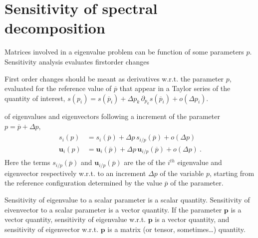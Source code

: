 \documentclass[letterpaper,10pt,english]{jupyterBook}
\begin{document}
\section{Sensitivity of spectral decomposition}
\label{\detokenize{ch/linear-algebra/spectral-sensitivity:sensitivity-of-spectral-decomposition}}\label{\detokenize{ch/linear-algebra/spectral-sensitivity:math-spectral-sensitivity}}\label{\detokenize{ch/linear-algebra/spectral-sensitivity::doc}}
\sphinxAtStartPar
Matrices involved in a eigenvalue problem can be function of some parameters \(p\). Sensitivity analysis evaluates first\sphinxhyphen{}order changes%
\begin{footnote}[1]\sphinxAtStartFootnote
First order changes should be meant as derivatives w.r.t. the parameter \(p\), evaluated for the reference value of \(\overline{p}\) that appear in a Taylor series of the quantity of interest, \(s(p_i) = s(\overline{p}_i) + \Delta p_k \, \partial_{p_k} s(\overline{p}_i) + o(\Delta p_i)\).
%
\end{footnote} of eigenvalues and eigenvectors following a increment of the parameter \(p = \overline{p} + \Delta p\),
\begin{equation*}
\begin{split}\begin{aligned}
  s_i(p) & = s_i(\overline{p}) + \Delta p \, s_{i/p} (\overline{p}) + o(\Delta p) \\
  \mathbf{u}_i(p) & = \mathbf{u}_i(\overline{p}) + \Delta p \, \mathbf{u}_{i/p} (\overline{p}) + o(\Delta p) \ .
\end{aligned}\end{split}
\end{equation*}
\sphinxAtStartPar
Here the terms \(s_{i/p}(\overline{p})\) and \(\mathbf{u}_{i/p}(\overline{p})\) are the  of the \(i^{th}\) eigenvalue and eigenvector respectively w.r.t. to an increment \(\Delta p\) of the variable \(p\), starting from the reference configuration determined by the value \(\overline{p}\) of the parameter.

\sphinxAtStartPar
{} Sensitivity of eigenvalue to a scalar parameter is a scalar quantity. Sensitivity of eivenvector to a scalar parameter is a vector quantity. If the parameter \(\mathbf{p}\) is a vector quantity, sensitivity of eigenvalue w.r.t. \(\mathbf{p}\) is a vector quantity, and sensitivity of eigenvector w.r.t. \(\mathbf{p}\) is a matrix (or tensor, sometimes…) quantity.
\end{document}
